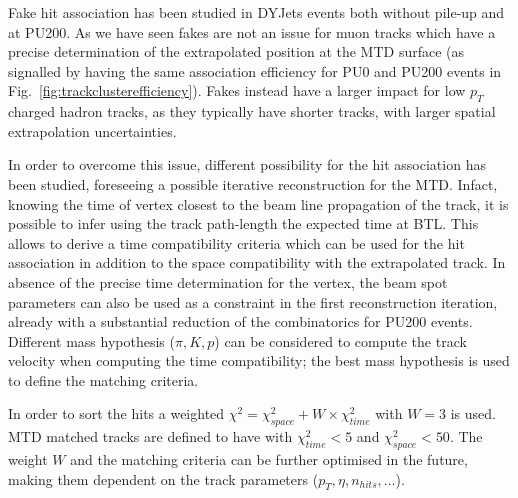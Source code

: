 Fake hit association has been studied in DYJets events both without pile-up and at PU200. As we have seen fakes are not an issue for muon tracks which have a precise determination of the extrapolated position at the MTD surface (as signalled by having the same association efficiency for PU0 and PU200 events in Fig.~\ref{fig:trackclusterefficiency}). Fakes instead have a larger impact for low $p_{T}$ charged hadron tracks, as they typically have shorter tracks, with larger spatial extrapolation uncertainties.


In order to overcome this issue, different possibility for the hit association has been studied, foreseeing a possible iterative reconstruction for the MTD. Infact, knowing the time of vertex closest to the beam line propagation of the track, it is possible to infer using the track path-length the expected time at BTL. This allows to derive a time compatibility criteria which can be used for the hit association in addition to the space compatibility with the extrapolated track. In absence of the precise time determination for the vertex, the beam spot parameters can also be used as a constraint in the first reconstruction iteration, already with a substantial reduction of the combinatorics for PU200 events. Different mass hypothesis ($\pi,K,p$) can be considered to compute the track velocity when computing the time compatibility; the best mass hypothesis is used to define the matching criteria. 

In order to sort the hits a weighted $\chi^2=\chi^2_{space}+W\times\chi^2_{time}$ with $W=3$ is used. MTD matched tracks are defined to have with $\chi^2_{time}<5$ and  $\chi^2_{space}<50$. The weight $W$ and the matching criteria can be further optimised in the future, making them dependent on the track parameters ($p_{T},\eta,n_{hits},\dots$).  

